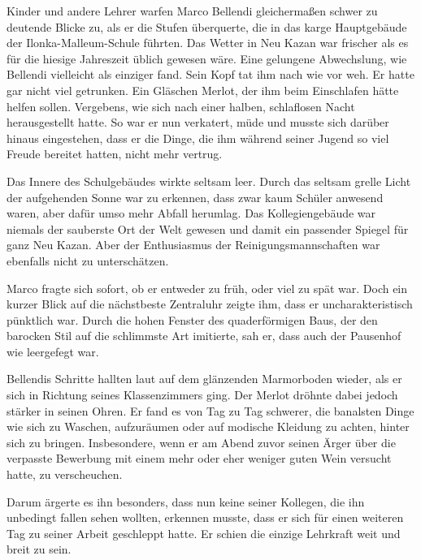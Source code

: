 Kinder und andere Lehrer warfen Marco Bellendi gleichermaßen schwer zu deutende Blicke zu, als er die Stufen überquerte, die in das karge Hauptgebäude der Ilonka-Malleum-Schule führten. Das Wetter in Neu Kazan war frischer als es für die hiesige Jahreszeit üblich gewesen wäre. Eine gelungene Abwechslung, wie Bellendi vielleicht als einziger fand. Sein Kopf tat ihm nach wie vor weh. Er hatte gar nicht viel getrunken. Ein Gläschen Merlot, der ihm beim Einschlafen hätte helfen sollen. Vergebens, wie sich nach einer halben, schlaflosen Nacht herausgestellt hatte. So war er nun verkatert, müde und musste sich darüber hinaus eingestehen, dass er die Dinge, die ihm während seiner Jugend so viel Freude bereitet hatten, nicht mehr vertrug.

\par

Das Innere des Schulgebäudes wirkte seltsam leer. Durch das seltsam grelle Licht der aufgehenden Sonne war zu erkennen, dass zwar kaum Schüler anwesend waren, aber dafür umso mehr Abfall herumlag. Das Kollegiengebäude war niemals der sauberste Ort der Welt gewesen und damit ein passender Spiegel für ganz Neu Kazan. Aber der Enthusiasmus der Reinigungsmannschaften war ebenfalls nicht zu unterschätzen.

\par

Marco fragte sich sofort, ob er entweder zu früh, oder viel zu spät war. Doch ein kurzer Blick auf die nächstbeste Zentraluhr zeigte ihm, dass er uncharakteristisch pünktlich war. Durch die hohen Fenster des quaderförmigen Baus, der den barocken Stil auf die schlimmste Art imitierte, sah er, dass auch der Pausenhof wie leergefegt war.

\par

Bellendis Schritte hallten laut auf dem glänzenden Marmorboden wieder, als er sich in Richtung seines Klassenzimmers ging. Der Merlot dröhnte dabei jedoch stärker in seinen Ohren. Er fand es von Tag zu Tag schwerer, die banalsten Dinge wie sich zu Waschen, aufzuräumen oder auf modische Kleidung zu achten, hinter sich zu bringen. Insbesondere, wenn er am Abend zuvor seinen Ärger über die verpasste Bewerbung mit einem mehr oder eher weniger guten Wein versucht hatte, zu verscheuchen.

\par

Darum ärgerte es ihn besonders, dass nun keine seiner Kollegen, die ihn unbedingt fallen sehen wollten, erkennen musste, dass er sich für einen weiteren Tag zu seiner Arbeit geschleppt hatte. Er schien die einzige Lehrkraft weit und breit zu sein.

